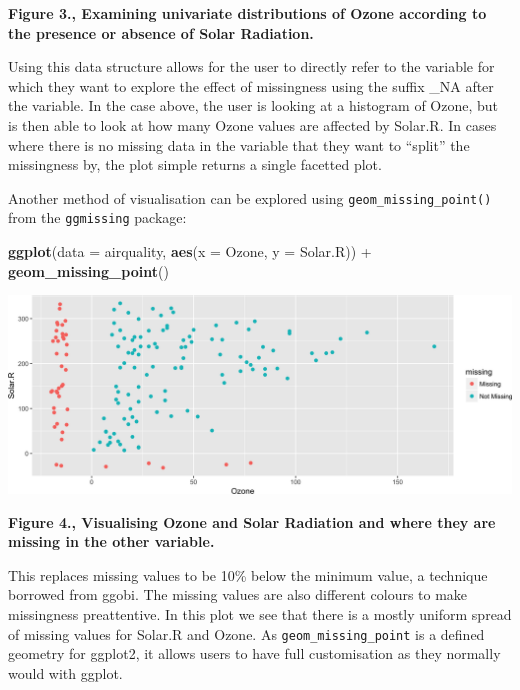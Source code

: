 \documentclass[]{article}
\newenvironment{Shaded}{\begin{snugshade}}{\end{snugshade}}
\newcommand{\KeywordTok}[1]{\textcolor[rgb]{0.13,0.29,0.53}{\textbf{{#1}}}}
\newcommand{\DataTypeTok}[1]{\textcolor[rgb]{0.13,0.29,0.53}{{#1}}}
\newcommand{\StringTok}[1]{\textcolor[rgb]{0.31,0.60,0.02}{{#1}}}
\newcommand{\NormalTok}[1]{{#1}}
\begin{document}
\textbf{Figure 3., Examining univariate distributions of Ozone according
to the presence or absence of Solar Radiation.}

Using this data structure allows for the user to directly refer to the
variable for which they want to explore the effect of missingness using
the suffix \_NA after the variable. In the case above, the user is
looking at a histogram of Ozone, but is then able to look at how many
Ozone values are affected by Solar.R. In cases where there is no missing
data in the variable that they want to ``split'' the missingness by, the
plot simple returns a single facetted plot.

Another method of visualisation can be explored using
\texttt{geom\_missing\_point()} from the \texttt{ggmissing} package:

\begin{Shaded}
\begin{Highlighting}[]
\KeywordTok{ggplot}\NormalTok{(}\DataTypeTok{data =} \NormalTok{airquality,}
       \KeywordTok{aes}\NormalTok{(}\DataTypeTok{x =} \NormalTok{Ozone,}
           \DataTypeTok{y =} \NormalTok{Solar.R)) +}\StringTok{ }
\StringTok{  }\KeywordTok{geom_missing_point}\NormalTok{()}
\end{Highlighting}
\end{Shaded}

\includegraphics{jsm2017_files/figure-latex/ggeom_missing-1.png}

\textbf{Figure 4., Visualising Ozone and Solar Radiation and where they
are missing in the other variable.}

This replaces missing values to be 10\% below the minimum value, a
technique borrowed from ggobi. The missing values are also different
colours to make missingness preattentive. In this plot we see that there
is a mostly uniform spread of missing values for Solar.R and Ozone. As
\texttt{geom\_missing\_point} is a defined geometry for ggplot2, it
allows users to have full customisation as they normally would with
ggplot.
\end{document}
